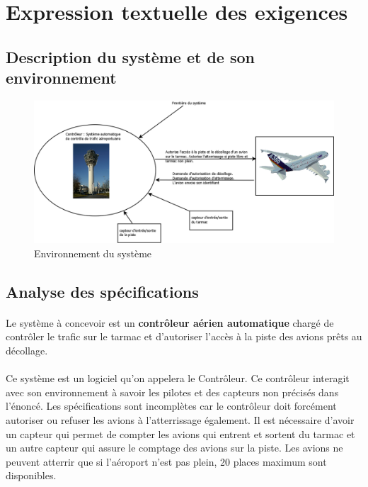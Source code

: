 \section{Expression textuelle des exigences}



\subsection{Description du système et de son environnement}
\begin{figure}[H]
	\begin{center}	
		\includegraphics[scale=0.3]{images/0/ctx}
		\caption{Environnement du système}
		\label{ctx}
	\end{center}
\end{figure}


\subsection{Analyse des spécifications}

\paragraph{}

Le système à concevoir est un \textbf{contrôleur aérien automatique} chargé de contrôler le trafic sur le tarmac et d'autoriser l'accès à la piste des avions prêts au décollage. 
\paragraph{}
Ce système est un logiciel qu'on appelera le Contrôleur. Ce contrôleur interagit avec son environnement à savoir les pilotes et des capteurs non précisés dans l'énoncé. Les spécifications sont incomplètes car le contrôleur doit forcément autoriser ou refuser les avions à l'atterrissage également. Il est nécessaire d'avoir un capteur qui permet de compter les avions qui entrent et sortent du tarmac et un autre capteur qui assure le comptage des avions sur la piste. Les avions ne peuvent atterrir que si l'aéroport n'est pas plein, 20 places maximum sont disponibles. 
